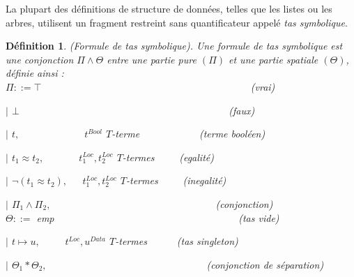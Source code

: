 \documentclass[11pt,openany]{article}
\newtheorem{definition}{D\'efinition}[subsection]
\begin{document}
	La plupart des d\'efinitions de structure de donn\'ees, telles que les listes ou les arbres, utilisent un fragment restreint sans quantificateur appel\'e \textit{tas symbolique}.
\begin{definition}
(Formule de tas symbolique). Une formule de \textit{tas symbolique} est une conjonction $\Pi\land\Theta$ entre une partie pure $(\Pi)$ et une partie spatiale $(\Theta)$, d\'efinie ainsi :\\
$\Pi ::= \top$~~~~~~~~~~~~~~~~~~~~~~~~~~~~~~~~~~~~~~~~~~(vrai)\par
$|$ $\bot$~~~~~~~~~~~~~~~~~~~~~~~~~~~~~~~~~~~~~~~~~~(faux)\par
$|$ $t,$~~~~~~~~~~~~~$t^{Bool}$ $T$-terme~~~~~~~~~~~~(terme bool\'een)\par
$|$ $t_{1}\approx t_{2},$~~~~~~~$t^{Loc}_{1},t^{Loc}_{2}$ $T$-termes~~~~~(egalit\'e)\par
$|$ $\neg(t_{1}\approx t_{2}),$~~~$t^{Loc}_{1},t^{Loc}_{2}$ $T$-termes~~~~~(inegalit\'e)\par
$|$ $\Pi_{1}\land\Pi_{2},$~~~~~~~~~~~~~~~~~~~~~~~~~~~~~~~~~(conjonction)\\
$\Theta ::=$ emp~~~~~~~~~~~~~~~~~~~~~~~~~~~~~~~~~~~~~(tas vide)\par
$|$ $t\mapsto u,$~~~~~$t^{Loc},u^{Data}$ $T$-termes~~~~~~(tas singleton)\par
$|$ $\Theta_{1}*\Theta_{2},$~~~~~~~~~~~~~~~~~~~~~~~~~~~~~~~~(conjonction de s\'eparation)
\end{definition}
\end{document}
